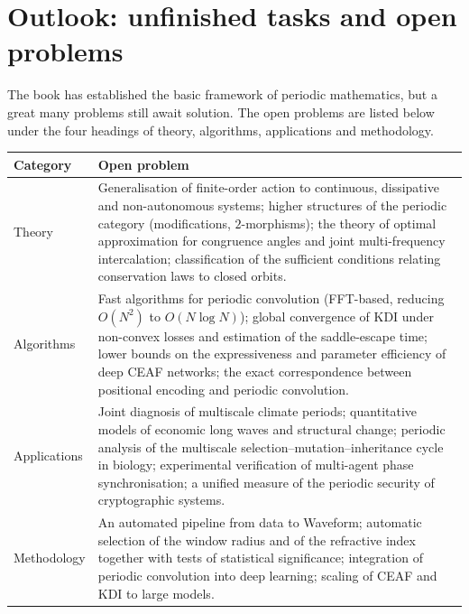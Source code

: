 \section{Outlook: unfinished tasks and open problems}

The book has established the basic framework of periodic mathematics, but a great many problems still await solution. The open problems are listed below under the four headings of theory, algorithms, applications and methodology.

\begin{center}
\renewcommand{\arraystretch}{1.3}
\small
\begin{tabularx}{\linewidth}{@{}>{\raggedright\arraybackslash\hspace{0pt}}p{3.0cm} >{\raggedright\arraybackslash\hspace{0pt}}X@{}}
\toprule
\textbf{Category} & \textbf{Open problem} \\
\midrule
Theory & Generalisation of finite-order action to continuous, dissipative and non-autonomous systems; higher structures of the periodic category (modifications, $2$-morphisms); the theory of optimal approximation for congruence angles and joint multi-frequency intercalation; classification of the sufficient conditions relating conservation laws to closed orbits. \\
Algorithms & Fast algorithms for periodic convolution (FFT-based, reducing $O(N^2)$ to $O(N\log N)$); global convergence of KDI under non-convex losses and estimation of the saddle-escape time; lower bounds on the expressiveness and parameter efficiency of deep CEAF networks; the exact correspondence between positional encoding and periodic convolution. \\
Applications & Joint diagnosis of multiscale climate periods; quantitative models of economic long waves and structural change; periodic analysis of the multiscale selection--mutation--inheritance cycle in biology; experimental verification of multi-agent phase synchronisation; a unified measure of the periodic security of cryptographic systems. \\
Methodology & An automated pipeline from data to Waveform; automatic selection of the window radius and of the refractive index together with tests of statistical significance; integration of periodic convolution into deep learning; scaling of CEAF and KDI to large models. \\
\bottomrule
\end{tabularx}
\end{center}

